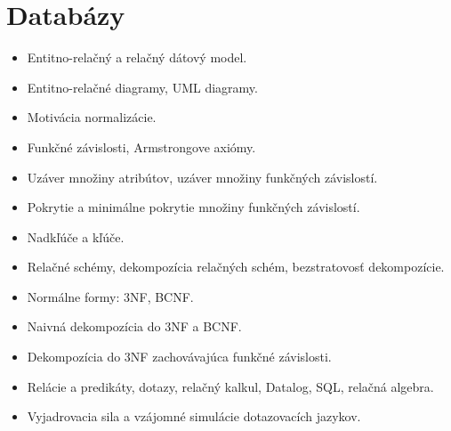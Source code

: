 \documentclass[a4paper]{report}
\begin{document}
\begingroup %
\tableofcontents
\endgroup %

\newpage
{}
\setcounter{page}{1}

\chapter{Databázy}

\begin{zadanie}

\begin{itemize}
 \item Entitno-relačný a relačný dátový model.
 \item Entitno-relačné diagramy, UML diagramy.
 \item Motivácia normalizácie.
\end{itemize}
\end{zadanie}

\begin{zadanie}

\begin{itemize}
 \item Funkčné závislosti, Armstrongove axiómy.
 \item Uzáver množiny atribútov, uzáver množiny funkčných závislostí.
 \item Pokrytie a minimálne pokrytie množiny funkčných závislostí.
 \item Nadkľúče a kľúče.
 \item Relačné schémy, dekompozícia relačných schém, bezstratovosť dekompozície.
 \item Normálne formy: 3NF, BCNF.
 \item Naivná dekompozícia do 3NF a BCNF.
 \item Dekompozícia do 3NF zachovávajúca funkčné závislosti.
\end{itemize}
\end{zadanie}

\begin{zadanie}
\begin{itemize}
 \item Relácie a predikáty, dotazy, relačný kalkul, Datalog, SQL, relačná algebra.
 \item Vyjadrovacia sila a vzájomné simulácie dotazovacích jazykov.
\end{itemize}
\end{zadanie}
\end{document}

